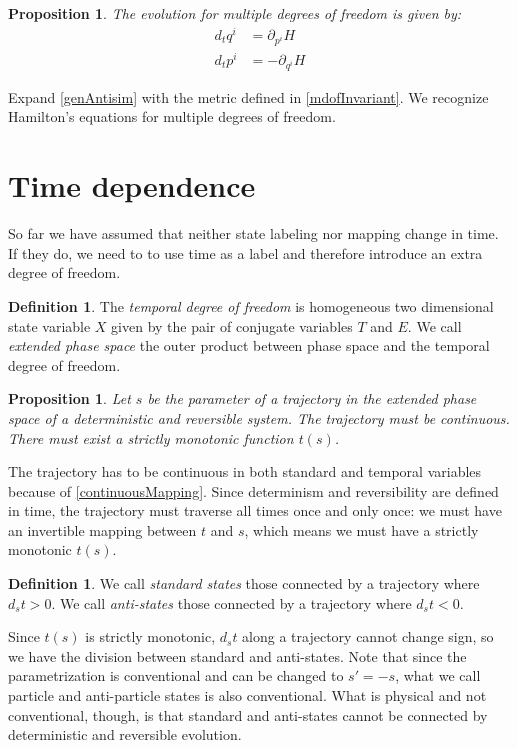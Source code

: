 \documentclass[aps,pra,10pt,twocolumn,floatfix,nofootinbib]{revtex4-1}
\newtheorem{prop}[thm]{Proposition}
\theoremstyle{definition}
\newtheorem{defn}[thm]{Definition}
\begin{document}
\begin{prop}\label{mdofHam}
The evolution for multiple degrees of freedom is given by:
\begin{align*}
d_{t}q^i &= \partial_{p^i} H \\
d_{t}p^i &= - \partial_{q^i} H
\end{align*}
\end{prop}

Expand \ref{genAntisim} with the metric defined in \ref{mdofInvariant}. We recognize Hamilton's equations for multiple degrees of freedom\cite{classical_dynamics}.

\section{Time dependence}
So far we have assumed that neither state labeling nor mapping change in time. If they do, we need to to use time as a label and therefore introduce an extra degree of freedom.

\begin{defn}\label{tdof}
The \emph{temporal degree of freedom} is homogeneous two dimensional state variable $X$ given by the pair of conjugate variables $T$ and $E$. We call \emph{extended phase space} the outer product between phase space and the temporal degree of freedom.
\end{defn}

\begin{prop}\label{tdofMonotonic}
Let $s$ be the parameter of a trajectory in the extended phase space of a deterministic and reversible system. The trajectory must be continuous. There must exist a strictly monotonic function $t(s)$.
\end{prop}

The trajectory has to be continuous in both standard and temporal variables because of \ref{continuousMapping}. Since determinism and reversibility are defined in time, the trajectory must traverse all times once and only once: we must have an invertible mapping between $t$ and $s$, which means we must have a strictly monotonic $t(s)$.

\begin{defn}\label{tdofAntistates}
We call \emph{standard states} those connected by a trajectory where $d_{s}t>0$. We call \emph{anti-states} those connected by a trajectory where $d_{s}t<0$.
\end{defn}

Since $t(s)$ is strictly monotonic, $d_{s}t$ along a trajectory cannot change sign, so we have the division between standard and anti-states. Note that since the parametrization is conventional and can be changed to $s'=-s$, what we call particle and anti-particle states is also conventional. What is physical and not conventional, though, is that standard and anti-states cannot be connected by deterministic and reversible evolution.
\end{document}
